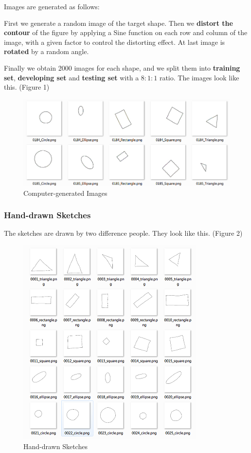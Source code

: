 Images are generated as follows:

First we generate a random image of the target shape. Then we \textbf{distort the contour} of the figure by applying a Sine function on each row and column of the image, with a given factor to control the distorting effect. At last image is \textbf{rotated} by a random angle.

Finally we obtain 2000 images for each shape, and we split them into \textbf{training set}, \textbf{developing set} and \textbf{testing set} with a $8:1:1$ ratio.  The images look like this. (Figure 1)

\begin{figure}[ht!]
\includegraphics[width=\columnwidth]{Figure_1_CG_Image.png}
\caption{Computer-generated Images}
\end{figure}

\subsubsection{Hand-drawn Sketches}

The sketches are drawn by two difference people. They look like this. (Figure 2)

\begin{figure}[ht!]
\includegraphics[width=\columnwidth]{Figure_2_Sketch_Image.png}
\caption{Hand-drawn Sketches}
\end{figure}
